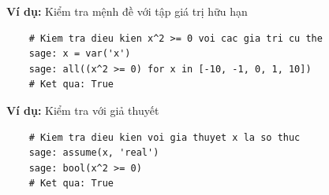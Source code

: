 \textbf{Ví dụ:} Kiểm tra mệnh đề với tập giá trị hữu hạn

\begin{lstlisting}
	# Kiem tra dieu kien x^2 >= 0 voi cac gia tri cu the
	sage: x = var('x')
	sage: all((x^2 >= 0) for x in [-10, -1, 0, 1, 10])
	# Ket qua: True
\end{lstlisting}

\textbf{Ví dụ:} Kiểm tra với giả thuyết

\begin{lstlisting}
	# Kiem tra dieu kien voi gia thuyet x la so thuc
	sage: assume(x, 'real')
	sage: bool(x^2 >= 0)
	# Ket qua: True
\end{lstlisting}
